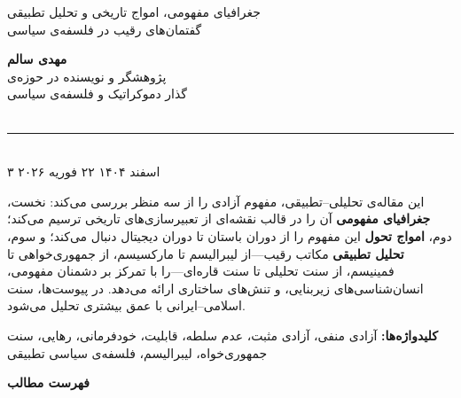 \begin{titlepage}
\begin{center}
\vspace{0.8cm}
{\Large\color{TextSecond}
  جغرافیای مفهومی، امواج تاریخی و تحلیل تطبیقی\\[0.3cm]
  گفتمان‌های رقیب در فلسفه‌ی سیاسی
}

\vspace{1.5cm}

\begin{tcolorbox}[
  enhanced, width=10cm,
  colback=BgCool, colframe=PrimaryMid,
  rounded corners, drop shadow,
]
\centering
{\large\bfseries\color{PrimaryDeep} مهدی سالم}\\[0.3cm]
{\normalsize\color{TextSecond}
  پژوهشگر و نویسنده در حوزه‌ی\\
  گذار دموکراتیک و فلسفه‌ی سیاسی
}\\[0.4cm]
\small\color{NeutralDark}
\\[0.2cm] %
{\color{AccentGold}\rule{6cm}{0.5pt}}\\[0.2cm]
{\small ۳ اسفند ۱۴۰۴ \textbar{} ۲۲ فوریه ۲۰۲۶}
\end{tcolorbox}

\end{center}

\vspace{1cm}

\begin{tcolorbox}[
  enhanced, breakable,
  colback=BgWarm, colframe=AccentGold,
  title={\bfseries چکیده},
  fonttitle=\large\bfseries,
  attach boxed title to top right={yshift=-2mm},
  boxed title style={colback=AccentGold, colframe=AccentAmber},
]
این مقاله‌ی تحلیلی–تطبیقی، مفهوم آزادی را از سه منظر بررسی می‌کند: نخست، \textbf{جغرافیای مفهومی} آن را در قالب نقشه‌ای از تعبیرسازی‌های تاریخی ترسیم می‌کند؛ دوم، \textbf{امواج تحول} این مفهوم را از دوران باستان تا دوران دیجیتال دنبال می‌کند؛ و سوم، \textbf{تحلیل تطبیقی} مکاتب رقیب—از لیبرالیسم تا مارکسیسم، از جمهوری‌خواهی تا فمینیسم، از سنت تحلیلی تا سنت قاره‌ای—را با تمرکز بر دشمنان مفهومی، انسان‌شناسی‌های زیربنایی، و تنش‌های ساختاری ارائه می‌دهد. در پیوست‌ها، سنت اسلامی–ایرانی با عمق بیشتری تحلیل می‌شود.

\vspace{0.3cm}
\small\color{NeutralDark}
\textbf{کلیدواژه‌ها:} آزادی منفی، آزادی مثبت، عدم سلطه، قابلیت، خودفرمانی، رهایی، سنت جمهوری‌خواه، لیبرالیسم، فلسفه‌ی سیاسی تطبیقی
\end{tcolorbox}

\end{titlepage}

\newpage
\thispagestyle{empty}
\begin{center}
{\Large\bfseries\color{PrimaryDeep} فهرست مطالب}
\vspace{0.5cm}
\end{center}
\tableofcontents
\newpage
